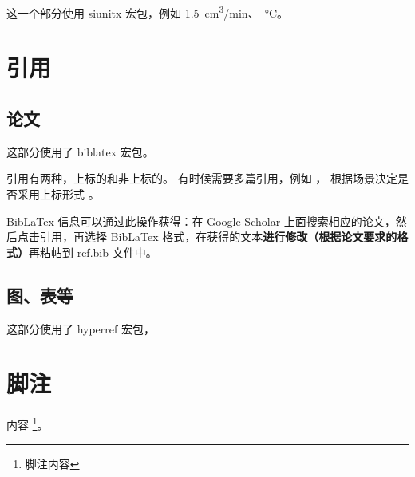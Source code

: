 这一个部分使用 siunitx 宏包，例如 \SI{1.5}{cm^3/min}、\SI{}{\degreeCelsius}。

\section{引用}

\subsection{论文}

这部分使用了 biblatex 宏包。

引用有两种，上标的和非上标的\cite{he2016deep}。
有时候需要多篇引用，例如 \cite{he2016deep, krizhevsky2012imagenet, vaswani2017attention}，
根据场景决定是否采用上标形式 。

BibLaTex 信息可以通过此操作获得：在 \href{https://scholar.google.com}{Google Scholar} 上面搜索相应的论文，然后点击引用，再选择 BibLaTex 格式，在获得的文本\textbf{进行修改（根据论文要求的格式）}再粘帖到 ref.bib 文件中。

\subsection{图、表等}

这部分使用了 hyperref 宏包，

\section{脚注}

内容 \footnote{脚注内容}。
